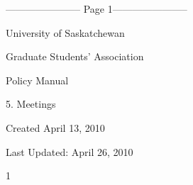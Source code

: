 ﻿----------------------- Page 1-----------------------

  

  

  

  

  

  

  

  

  

                                           University of Saskatchewan  

  

                                    Graduate Students’ Association  

  

  

  

  

  

  

  

  

  

  

  

  

  

  

  

  

  

  

  

  

  

  

  

                                                     Policy Manual  

  

                                                        5. Meetings  

  

  

  

  

  

  

  

Created April 13, 2010  

  

Last Updated: April 26, 2010  



                                                                          1  

